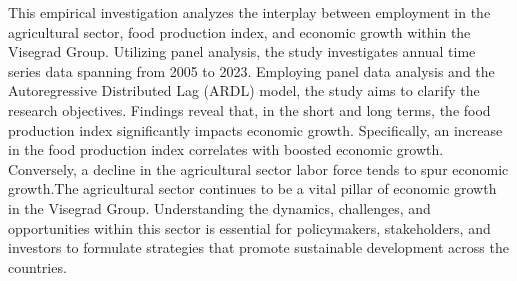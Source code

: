 
\begin{Abstrakt}
    This empirical investigation analyzes the interplay between employment in the agricultural sector, food production index, and economic growth within the Visegrad Group. Utilizing panel analysis, the study investigates annual time series data spanning from 2005 to 2023. Employing panel data analysis and the Autoregressive Distributed Lag (ARDL) model, the study aims to clarify the research objectives. Findings reveal that, in the short and long terms, the food production index significantly impacts economic growth. Specifically, an increase in the food production index correlates with boosted economic growth. Conversely, a decline in the agricultural sector labor force tends to spur economic growth.\newline The agricultural sector continues to be a vital pillar of economic growth in the Visegrad Group. Understanding the dynamics, challenges, and opportunities within this sector is essential for policymakers, stakeholders, and investors to formulate strategies that promote sustainable development across the countries.
\end{Abstrakt}



\clearpage